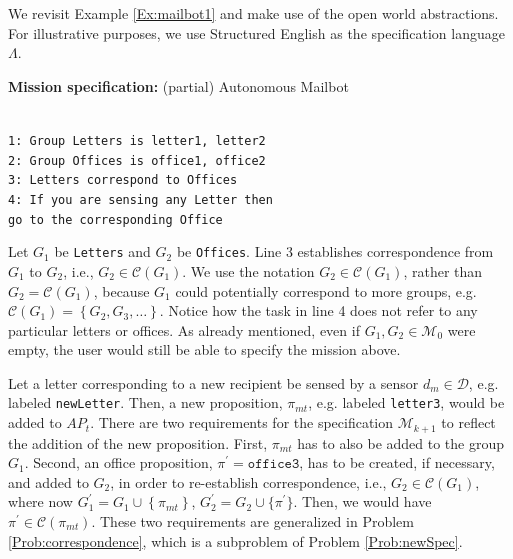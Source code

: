 \begin{myExample}\label{Ex:mailbot2}We revisit Example \ref{Ex:mailbot1} and make use of the open world abstractions. For illustrative purposes, we use Structured English \cite{JFRKGICRA12} as the specification language $\Lambda$.
\begin{algorithm}
\textbf{Mission specification:} (partial) Autonomous Mailbot
	
	\vspace{-6 pt}
	\hrulefill\\
	{\small
\texttt{1: Group Letters is letter1, letter2} \\
\texttt{2: Group Offices is office1, office2} \\
\texttt{3: Letters correspond to Offices} \\
\texttt{4: If you are sensing any Letter then}\\
\texttt{go to the corresponding Office}\\ 
}
\vspace{-10 pt}
\end{algorithm}

Let $G_1$ be \texttt{Letters} and $G_2$ be \texttt{Offices}. Line 3 establishes correspondence from $G_1$ to $G_2$, i.e., $G_2 \in \mathcal{C}(G_1)$. We use the notation $G_2 \in \mathcal{C}(G_1)$, rather than $G_2 = \mathcal{C}(G_1)$, because $G_1$ could potentially correspond to more groups, e.g. $\mathcal{C}(G_1) = \left\{ G_2, G_3, \ldots\right\}$. 
Notice how the task in line 4 does not refer to any particular letters or offices. 
As already mentioned, even if $G_1, G_2 \in \mathcal{M}_0$ were empty, the user would still be able to specify the mission above.
\end{myExample}

Let a letter corresponding to a new recipient be sensed by a sensor $d_{m} \in \mathcal{D}$, e.g. labeled \texttt{newLetter}. Then, a new proposition, $\pi_{mt}$, e.g. labeled \texttt{letter3}, would be added to $AP_t$. 
There are two requirements for the specification $\mathcal{M}_{k+1}$ to reflect the addition of the new proposition. 
First, $\pi_{mt}$ has to also be added to the group $G_1$. 
Second, an office proposition, $\pi^\prime = \texttt{office3}$, has to be created, if necessary, and added to $G_2$, in order to re-establish correspondence, i.e., $G_2 \in \mathcal{C}(G_1)$, where now $G_{1}^\prime = G_1 \cup \left\{ \pi_{mt} \right\}$, $G_{2}^\prime = G_2 \cup \{ \pi^\prime \}$. 
Then, we would have $\pi^\prime \in \mathcal{C}(\pi_{mt})$. 
These two requirements are generalized in Problem \ref{Prob:correspondence}, which is a subproblem of Problem \ref{Prob:newSpec}.

